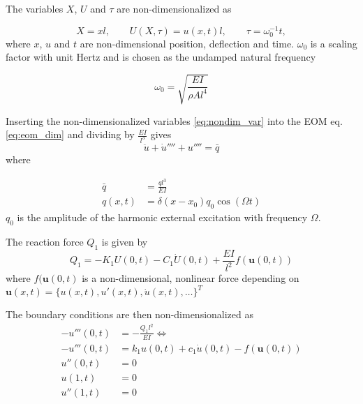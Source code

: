 The variables $X$, $U$ and $\tau$ are non-dimensionalized as

\begin{equation}
  \label{eq:nondim_var}
  X = xl, \qquad U(X,\tau) = u(x,t)l, \qquad \tau = \omega_0^{-1}t,
\end{equation}
where $x$, $u$ and $t$ are non-dimensional position, deflection and time.
$\omega_0$ is a scaling factor with unit Hertz and is chosen as the undamped
natural frequency

\begin{equation}
  \label{eq:omega_def}
  \omega_0 = \sqrt{\frac{EI}{\rho A l^4}}
\end{equation}

Inserting the non-dimensionalized variables \eqref{eq:nondim_var} into the EOM
eq. \eqref{eq:eom_dim} and dividing by $\tfrac{EI}{l^3}$ gives
\begin{equation}
  \ddot u + \dot u'''' + u'''' = \bar q
  \label{eq:eom_nondim}
\end{equation}
where

\begin{align}
  \label{eq:ext_force_nondim}
  \bar q &= \frac{ql^3}{EI} \\
  q(x, t) &= \delta(x - x_0)q_0 \cos(\Omega t)
\end{align}
$q_0$ is the amplitude of the harmonic external excitation with frequency
$\Omega$.


The reaction force $Q_1$ is given by
\begin{equation}
  \label{eq:q1}
  Q_1 = -K_1 U(0, t) - C_1 \dot U(0,t) + \frac{EI}{l^2} f(\bm u(0,t))
\end{equation}
where $f(\bm u(0,t)$ is a non-dimensional, nonlinear force depending on\\
$\bm u(x,t) = \{u(x,t), u'(x,t), \dot u(x,t), \dots \}^T$

The boundary conditions are then non-dimensionalized as
\begin{subequations}
\begin{align}
  -u'''(0, t) &= -\frac{Q_1l^2}{EI} \nonumber \iff \\
  -u'''(0, t) &= k_1u(0,t) + c_1\dot u(0,t) - f(\bm u(0,t))  \\
  u''(0, t) &= 0 \\
  u(1, t) &= 0 \\
  u''(1, t)  &= 0
\end{align}
\label{eq:eom_nondim_boundary_cond}
\end{subequations}

